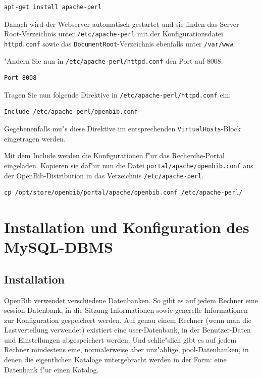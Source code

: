 \documentclass[11pt, twoside, a4paper, BCOR8mm, DIV12, bibtotoc,idxtotoc]{scrbook}
\begin{document}
\begin{verbatim}
apt-get install apache-perl
\end{verbatim}

Danach wird der Webserver automatisch gestartet und sie finden das
Server-Root-Verzeichnis unter \texttt{/etc/apache-perl} mit der
Konfigurationsdatei \texttt{httpd.conf} sowie das
\texttt{DocumentRoot}-Verzeichnis ebenfalls unter \texttt{/var/www}.

"Andern Sie nun in \texttt{/etc/apache-perl/httpd.conf} den Port auf
8008:

\begin{verbatim}
Port 8008
\end{verbatim}

Tragen Sie nun folgende Direktive in \texttt{/etc/apache-perl/httpd.conf} ein:

\begin{verbatim}
Include /etc/apache-perl/openbib.conf
\end{verbatim}

Gegebenenfalls mu"s diese Direktive im entsprechenden
\texttt{VirtualHosts}-Block eingetragen werden.

Mit dem Include werden die Konfigurationen f"ur das Recherche-Portal
eingeladen. Kopieren sie daf"ur nun die Datei
\texttt{portal/apache/openbib.conf} aus der OpenBib-Distribution in
das Verzeichnis \texttt{/etc/apache-perl}.

\begin{verbatim}
cp /opt/store/openbib/portal/apache/openbib.conf /etc/apache-perl/
\end{verbatim}


\section{Installation und Konfiguration des MySQL-DBMS}
\label{sec:instmysql}


\subsection{Installation}

OpenBib verwendet verschiedene Datenbanken. So gibt es auf jedem
Rechner eine session-Datenbank, in die Sitzung-Informationen sowie
generelle Informationen zur Konfiguration gespeichert werden. Auf
genau einem Rechner (wenn man die Lastverteilung verwendet) existiert
eine user-Datenbank, in der Benutzer-Daten und Einstellungen
abgespeichert werden. Und schlie"slich gibt es auf jedem Rechner
mindestens eine, normalerweise aber unz"ahlige, pool-Datenbanken, in
denen die eigentlichen Kataloge untergebracht werden in der Form: eine
Datenbank f"ur einen Katalog.
\end{document}
